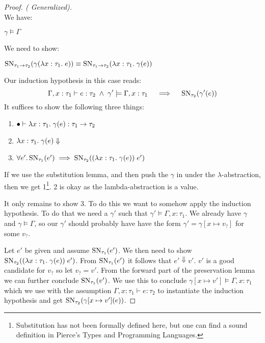 \begin{proof}[Proof. ( Generalized)]
\case{\TAbs} \\
We have: 
\begin{description}
  \item $\gamma \models \Gamma$
\end{description}
We need to show:
\begin{description}
  \item $\operatorname{SN}_{ \tau_1 \rightarrow \tau_2}(\gamma(\lambda x : \tau_1 . \; e)) \equiv \operatorname{SN}_{ \tau_1 \rightarrow \tau_2}(\lambda x : \tau_1 . \; \gamma(e))$
\end{description}
Our induction hypothesis in this case reads:
\[
  \Gamma,x:\tau_1 \vdash e : \tau_2 \; \wedge \; \gamma' \models \Gamma, x : \tau_1 \quad \implies \quad \operatorname{SN}_{\tau_2}(\gamma'(e))
\]
It suffices to show the following three things:
\begin{enumerate}
\item $\bullet \vdash \lambda x : \tau_1 . \; \gamma(e) :  \tau_1 \rightarrow \tau_2$
\item $\lambda x : \tau_1 . \; \gamma(e) \Downarrow$
\item $\forall e'. \operatorname{SN}_{\tau_1}(e') \implies \operatorname{SN}_{\tau_2}((\lambda x : \tau_1 . \; \gamma(e)) \; e')$
\end{enumerate}
If we use the substitution lemma, and then push the $\gamma$ in under the $\lambda$-abstraction, then we get 1\footnote{Substitution has not been formally defined here, but one can find a sound definition in Pierce's Types and Programming Languages.}. 2 is okay as the lambda-abstraction is a value. 

It only remains to show 3. To do this we want to somehow apply the induction hypothesis. To do that we need a $\gamma'$ such that $\gamma' \models \Gamma, x:\tau_1$. We already have $\gamma$ and $\gamma \models \Gamma$, so our $\gamma'$ should probably have have the form $\gamma' = \gamma[x \mapsto v_?]$ for some $v_?$.

Let $e'$ be given and assume $\operatorname{SN}_{\tau_1}(e')$. We then need to show $\operatorname{SN}_{\tau_2}((\lambda x : \tau_1 . \; \gamma(e)) \; e')$. From $\operatorname{SN}_{\tau_1}(e')$ it follows that $e' \Downarrow v'$. $v'$ is a good candidate for $v_?$ so let $v_? = v'$. From the forward part of the preservation lemma we can further conclude $\operatorname{SN}_{\tau_1}(v')$. We use this to conclude $\gamma[x\mapsto v'] \models \Gamma, x:\tau_1$ which we use with the assumption $\Gamma,x:\tau_1 \vdash e : \tau_2$ to instantiate the induction hypothesis and get $\operatorname{SN}_{\tau_2}(\gamma[x\mapsto v'](e))$.


\end{proof}
